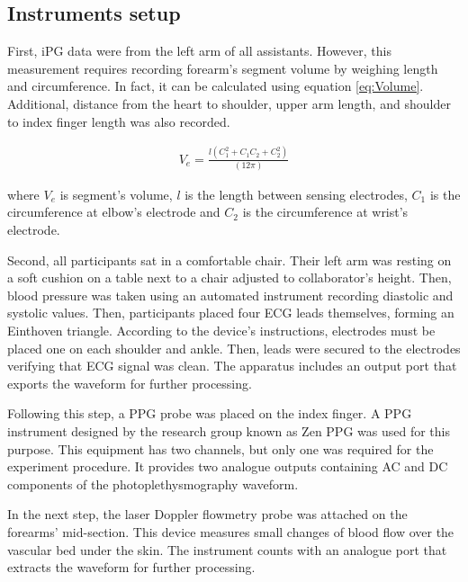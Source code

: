 
\subsection{Instruments setup}
\label{section4.1.1}

First, iPG data were from the left arm of all assistants. However, this measurement requires recording forearm's segment volume by weighing length and circumference. In fact, it can be calculated using equation \ref{eq:Volume}. Additional, distance from the heart to shoulder, upper arm length, and shoulder to index finger length was also recorded. 

\begin{align}
\label{eq:Volume}
V_e =\frac{l(C_1^2+C_1 C_2 + C_2^2)}{(12\pi)}
\end{align}

where $V_e$ is segment's volume, $l$ is the length between sensing electrodes, $C_1$ is the circumference at elbow's electrode and $C_2$ is the circumference at wrist's electrode.

Second, all participants sat in a comfortable chair. Their left arm was resting on a soft cushion on a table next to a chair adjusted to collaborator's height. Then, blood pressure was taken using an automated instrument recording diastolic and systolic values. Then, participants placed four ECG leads themselves, forming an Einthoven triangle. According to the device's instructions, electrodes must be placed one on each shoulder and ankle. Then, leads were secured to the electrodes verifying that ECG signal was clean. The apparatus includes an output port that exports the waveform for further processing.



Following this step, a PPG probe was placed on the index finger. A PPG instrument designed by the research group known as Zen PPG was used for this purpose. This equipment has two channels, but only one was required for the experiment procedure. It provides two analogue outputs containing AC and DC components of the photoplethysmography waveform. 


In the next step, the laser Doppler flowmetry probe was attached on the forearms' mid-section. This device measures small changes of blood flow over the vascular bed under the skin. The instrument counts with an analogue port that extracts the waveform for further processing.  

